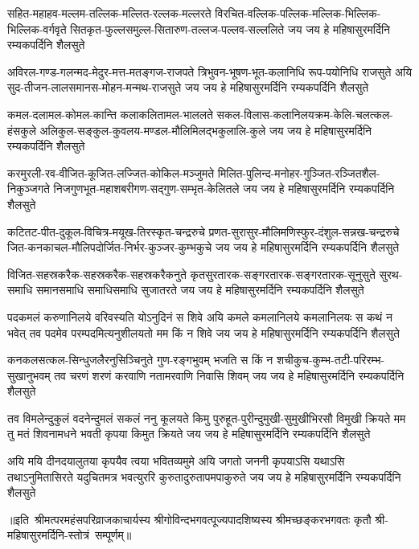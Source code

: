 \fourlineindentedshloka
{सहित-महाहव-मल्लम-तल्लिक-मल्लित-रल्लक-मल्लरते}
{विरचित-वल्लिक-पल्लिक-मल्लिक-भिल्लिक-भिल्लिक-वर्गवृते}
{सितकृत-फुल्लसमुल्ल-सितारुण-तल्लज-पल्लव-सल्ललिते}
{जय जय हे महिषासुरमर्दिनि रम्यकपर्दिनि शैलसुते}

\fourlineindentedshloka
{अविरल-गण्ड-गलन्मद-मेदुर-मत्त-मतङ्गज-राजपते}
{त्रिभुवन-भूषण-भूत-कलानिधि रूप-पयोनिधि राजसुते}
{अयि सुद-तीजन-लालसमानस-मोहन-मन्मथ-राजसुते}
{जय जय हे महिषासुरमर्दिनि रम्यकपर्दिनि शैलसुते}

\fourlineindentedshloka
{कमल-दलामल-कोमल-कान्ति कलाकलितामल-भाललते}
{सकल-विलास-कलानिलयक्रम-केलि-चलत्कल-हंसकुले}
{अलिकुल-सङ्कुल-कुवलय-मण्डल-मौलिमिलद्भकुलालि-कुले}
{जय जय हे महिषासुरमर्दिनि रम्यकपर्दिनि शैलसुते}

\fourlineindentedshloka
{करमुरली-रव-वीजित-कूजित-लज्जित-कोकिल-मञ्जुमते}
{मिलित-पुलिन्द-मनोहर-गुञ्जित-रञ्जितशैल-निकुञ्जगते}
{निजगुणभूत-महाशबरीगण-सद्गुण-सम्भृत-केलितले}
{जय जय हे महिषासुरमर्दिनि रम्यकपर्दिनि शैलसुते}

\fourlineindentedshloka
{कटितट-पीत-दुकूल-विचित्र-मयूख-तिरस्कृत-चन्द्ररुचे}
{प्रणत-सुरासुर-मौलिमणिस्फुर-दंशुल-सन्नख-चन्द्ररुचे}
{जित-कनकाचल-मौलिपदोर्जित-निर्भर-कुञ्जर-कुम्भकुचे}
{जय जय हे महिषासुरमर्दिनि रम्यकपर्दिनि शैलसुते}

\fourlineindentedshloka
{विजित-सहस्रकरैक-सहस्रकरैक-सहस्रकरैकनुते}
{कृतसुरतारक-सङ्गरतारक-सङ्गरतारक-सूनुसुते}
{सुरथ-समाधि समानसमाधि समाधिसमाधि सुजातरते}
{जय जय हे महिषासुरमर्दिनि रम्यकपर्दिनि शैलसुते}

\fourlineindentedshloka
{पदकमलं करुणानिलये वरिवस्यति योऽनुदिनं स शिवे}
{अयि कमले कमलानिलये कमलानिलयः स कथं न भवेत्}
{तव पदमेव परम्पदमित्यनुशीलयतो मम किं न शिवे}
{जय जय हे महिषासुरमर्दिनि रम्यकपर्दिनि शैलसुते}

\fourlineindentedshloka
{कनकलसत्कल-सिन्धुजलैरनुसिञ्चिनुते गुण-रङ्गभुवम्}
{भजति स किं न शचीकुच-कुम्भ-तटी-परिरम्भ-सुखानुभवम्}
{तव चरणं शरणं करवाणि नतामरवाणि निवासि शिवम्}
{जय जय हे महिषासुरमर्दिनि रम्यकपर्दिनि शैलसुते}

\fourlineindentedshloka
{तव विमलेन्दुकुलं वदनेन्दुमलं सकलं ननु कूलयते}
{किमु पुरुहूत-पुरीन्दुमुखी-सुमुखीभिरसौ विमुखी क्रियते}
{मम तु मतं शिवनामधने भवती कृपया किमुत क्रियते}
{जय जय हे महिषासुरमर्दिनि रम्यकपर्दिनि शैलसुते}

\fourlineindentedshloka
{अयि मयि दीनदयालुतया कृपयैव त्वया भवितव्यमुमे}
{अयि जगतो जननी कृपयाऽसि यथाऽसि तथाऽनुमितासिरते}
{यदुचितमत्र भवत्युररि कुरुतादुरुतापमपाकुरुते}
{जय जय हे महिषासुरमर्दिनि रम्यकपर्दिनि शैलसुते}

॥इति~श्रीमत्परमहंसपरिव्राजकाचार्यस्य श्रीगोविन्दभगवत्पूज्यपादशिष्यस्य 
श्रीमच्छङ्करभगवतः कृतौ  श्री-महिषासुरमर्दिनि-स्तोत्रं~सम्पूर्णम्॥
\setlength{\shlokaspaceskip}{24pt}